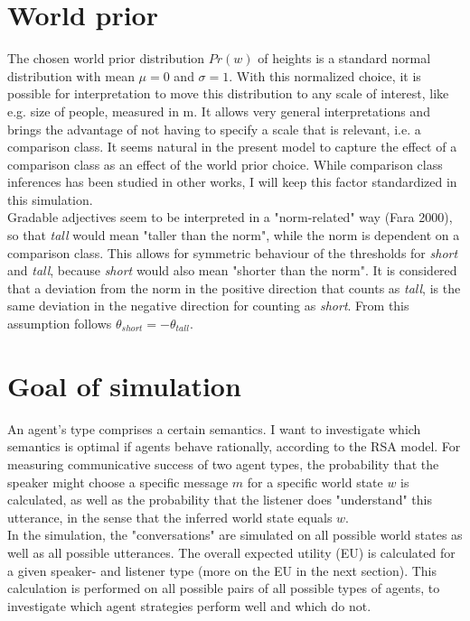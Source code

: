 \section{World prior}

The chosen world prior distribution $Pr(w)$ of heights is a standard normal distribution with mean $\mu = 0$ and $\sigma = 1$. With this normalized choice, it is possible for interpretation to move this distribution to any scale of interest, like e.g. size of people, measured in m. 
It allows very general interpretations and brings the advantage of not having to specify a scale that is relevant, i.e. a comparison class.  It seems natural in the present model to capture the effect of a comparison class as an effect of the world prior choice. While comparison class inferences has been studied in other works, I will keep this factor standardized in this simulation.\\

Gradable adjectives seem to be interpreted in a "norm-related" way (Fara 2000), so that \textit{tall} would mean "taller than the norm", while the norm is dependent on a comparison class. This allows for symmetric behaviour of the thresholds for \textit{short} and \textit{tall}, because \textit{short} would also mean "shorter than the norm". It is considered that a deviation from the norm in the positive direction that counts as \textit{tall}, is the same deviation in the negative direction for counting as \textit{short}. From this assumption follows $\theta_{short} = -\theta_{tall}$.

\section{Goal of simulation}

An agent's type comprises a certain semantics. I want to investigate which semantics is optimal if agents behave rationally, according to the RSA model.
For measuring communicative success of two agent types, the probability that the speaker might choose a specific message $m$ for a specific world state $w$ is calculated, as well as the probability that the listener does "understand" this utterance, in the sense that the inferred world state equals $w$.\\

In the simulation, the "conversations" are simulated on all possible world states as well as all possible utterances. The overall expected utility (EU) is calculated for a given speaker- and listener type (more on the EU in the next section).
This calculation is performed on all possible pairs of all possible types of agents, to investigate which agent strategies perform well and which do not. 

